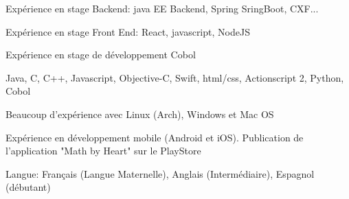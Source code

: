 \begin{cvitems}
\item{Expérience en stage Backend: java EE Backend, Spring SringBoot, CXF...}
\item{Expérience en stage Front End: React, javascript, NodeJS}
\item{Expérience en stage de développement Cobol}
\item{Java, C, C++, Javascript, Objective-C, Swift, html/css, Actionscript 2, Python, Cobol}
\item{Beaucoup d'expérience avec Linux (Arch), Windows et Mac OS}
\item{Expérience en développement mobile (Android et iOS). Publication de l'application "Math by Heart" sur le PlayStore}
\item{Langue: Français (Langue Maternelle), Anglais (Intermédiaire), Espagnol (débutant)}
\end{cvitems}

